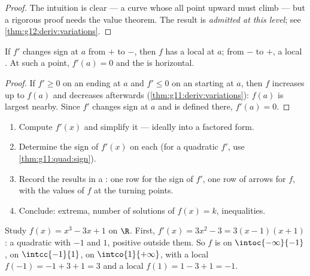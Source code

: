 \begin{proof}
The intuition is clear --- a curve whose  all point upward must
climb --- but a rigorous proof needs the  value theorem. The result is
\emph{admitted at this level}; see \cref{thm:g12:deriv:variations}.
\end{proof}

\begin{proposition}[Extrema]\label{prop:g11:deriv:extrema}
If $f'$ changes sign at $a$ from $+$ to $-$, then $f$ has a local 
at $a$; from $-$ to $+$, a local . At such a point, $f'(a) = 0$ and
the  is horizontal.
\end{proposition}

\begin{proof}
If $f' \geq 0$ on an  ending at $a$ and $f' \leq 0$ on an 
starting at $a$, then $f$ increases up to $f(a)$ and decreases afterwards
(\cref{thm:g11:deriv:variations}): $f(a)$ is largest nearby. Since $f'$
changes sign at $a$ and is defined there, $f'(a) = 0$.
\end{proof}

\begin{method}\label{met:g11:deriv:study}
\begin{enumerate}
  \item Compute $f'(x)$ and simplify it --- ideally into a factored form.
  \item Determine the sign of $f'(x)$ on each  (for a quadratic
        $f'$, use \cref{thm:g11:quad:sign}).
  \item Record the results in a \emph{}: one row for the
        sign of $f'$, one row of arrows for $f$, with the values of $f$ at
        the turning points.
  \item Conclude: extrema, number of solutions of $f(x) = k$, inequalities.
\end{enumerate}
\end{method}

\begin{example}\label{ex:g11:deriv:study}
Study $f(x) = x^3 - 3x + 1$ on $\R$. First,
$f'(x) = 3x^2 - 3 = 3(x-1)(x+1)$: a quadratic with  $-1$ and $1$,
positive outside them. So $f$ is  on $\intoc{-\infty}{-1}$,
 on $\intcc{-1}{1}$,  on $\intco{1}{+\infty}$, with a
local  $f(-1) = -1 + 3 + 1 = 3$ and a local 
$f(1) = 1 - 3 + 1 = -1$.
\end{example}

